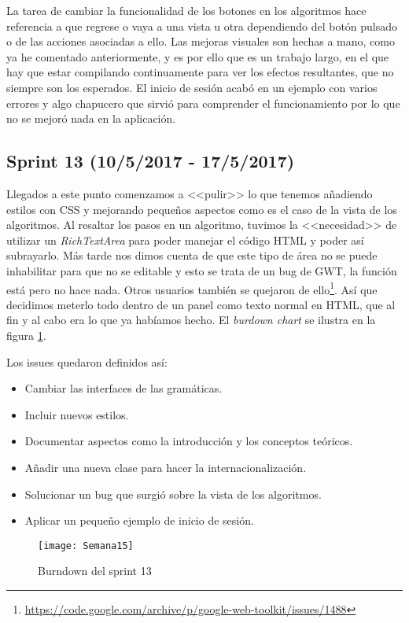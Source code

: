 La tarea de cambiar la funcionalidad de los botones en los algoritmos hace referencia a que regrese o vaya a una vista u otra dependiendo del botón pulsado o de las acciones asociadas a ello.
Las mejoras visuales son hechas a mano, como ya he comentado anteriormente, y es por ello que es un trabajo largo, en el que hay que estar compilando continuamente para ver los efectos resultantes, que no siempre son los esperados.
El inicio de sesión acabó en un ejemplo con varios errores y algo chapucero que sirvió para comprender el funcionamiento por lo que no se mejoró nada en la aplicación.

\subsection{Sprint 13 (10/5/2017 - 17/5/2017)}

Llegados a este punto comenzamos a <<pulir>> lo que tenemos añadiendo estilos con CSS y mejorando pequeños aspectos como es el caso de la vista de los algoritmos. Al resaltar los pasos en un algoritmo, tuvimos la <<necesidad>> de utilizar un \emph{RichTextArea} para poder manejar el código HTML y poder así subrayarlo. Más tarde nos dimos cuenta de que este tipo de área no se puede inhabilitar para que no se editable y esto se trata de un bug de GWT, la función está pero no hace nada. Otros usuarios también se quejaron de ello\footnote{\url{https://code.google.com/archive/p/google-web-toolkit/issues/1488}}. Así que decidimos meterlo todo dentro de un panel como texto normal en HTML, que al fin y al cabo era lo que ya habíamos hecho. El \emph{burdown chart} se ilustra en la figura \ref{fig:A.12}.

Los issues quedaron definidos así:
\begin{itemize}
\item Cambiar las interfaces de las gramáticas.
\item Incluir nuevos estilos.
\item Documentar aspectos como la introducción y los conceptos teóricos.
\item Añadir una nueva clase para hacer la internacionalización.
\item Solucionar un bug que surgió sobre la vista de los algoritmos.
\item Aplicar un pequeño ejemplo de inicio de sesión.
\end{itemize}

\begin{figure}[h]
\centering
\texttt{[image: Semana15]}
\caption{Burndown del sprint 13}
\label{fig:A.12}
\end{figure}

